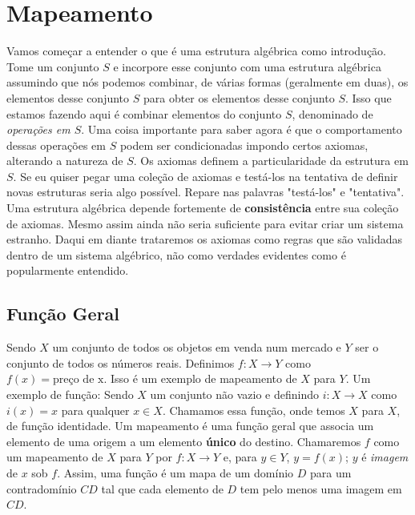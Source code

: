 
\section{Mapeamento}
Vamos começar a entender o que é uma estrutura algébrica como introdução. Tome um conjunto $S$ e incorpore esse conjunto com uma estrutura algébrica assumindo que nós podemos combinar, de várias formas (geralmente em duas), os elementos desse conjunto $S$ para obter os elementos desse conjunto $S$. Isso que estamos fazendo aqui é combinar elementos do conjunto $S$, denominado de \textit{operações em $S$}. Uma coisa importante para saber agora é que o comportamento dessas operações em $S$ podem ser condicionadas impondo certos axiomas, alterando a natureza de $S$. Os axiomas definem a particularidade da estrutura em $S$. Se eu quiser pegar uma coleção de axiomas e testá-los na tentativa de definir novas estruturas seria algo possível. Repare nas palavras "testá-los" e "tentativa". Uma estrutura algébrica depende fortemente de \textbf{consistência} entre sua coleção de axiomas. Mesmo assim ainda não seria suficiente para evitar criar um sistema estranho. Daqui em diante trataremos os axiomas como regras que são validadas dentro de um sistema algébrico, não como verdades evidentes como é popularmente entendido.
\subsection{Função Geral}
Sendo $X$ um conjunto de todos os objetos em venda num mercado e $Y$ ser o conjunto de todos os números reais. Definimos $f:X \to Y$ como $f(x) = \textrm{preço de x}$. Isso é um exemplo de mapeamento de $X$ para $Y$.
Um exemplo de função: Sendo $X$ um conjunto não vazio e definindo $i:X \to X$ como $i(x) = x$ para qualquer $x \in X$. Chamamos essa função, onde temos $X$ para $X$, de função identidade.\newline
Um mapeamento é uma função geral que associa um elemento de uma origem a um elemento \textbf{único} do destino. Chamaremos $f$ como um mapeamento de $X$ para $Y$ por $f:X \to Y$ e, para $y \in Y$, $y = f(x)$; $y$ é \textit{imagem} de $x$ sob $f$.
Assim, uma função é um mapa de um domínio $D$ para um contradomínio $CD$ tal que cada elemento de $D$ tem pelo menos uma imagem em $CD$.


